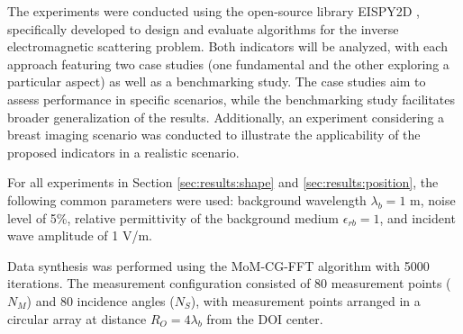 \documentclass{IEEEtran}
\begin{document}

        The experiments were conducted using the open-source library EISPY2D \cite{batista2025eispy2d}, specifically developed to design and evaluate algorithms for the inverse electromagnetic scattering problem. Both indicators will be analyzed, with each approach featuring two case studies (one fundamental and the other exploring a particular aspect) as well as a benchmarking study. The case studies aim to assess performance in specific scenarios, while the benchmarking study facilitates broader generalization of the results. Additionally, an experiment considering a breast imaging scenario was conducted to illustrate the applicability of the proposed indicators in a realistic scenario.


        For all experiments in Section \ref{sec:results:shape} and \ref{sec:results:position}, the following common parameters were used: background wavelength $\lambda_b = 1$ m, noise level of 5\%, relative permittivity of the background medium $\epsilon_{rb} = 1$, and incident wave amplitude of 1 V/m. 

        Data synthesis was performed using the MoM-CG-FFT algorithm \cite{su1987calculation} with 5000 iterations. The measurement configuration consisted of 80 measurement points ($N_M$) and 80 incidence angles ($N_S$), with measurement points arranged in a circular array at distance $R_O = 4\lambda_b$ from the DOI center. 
\end{document}
